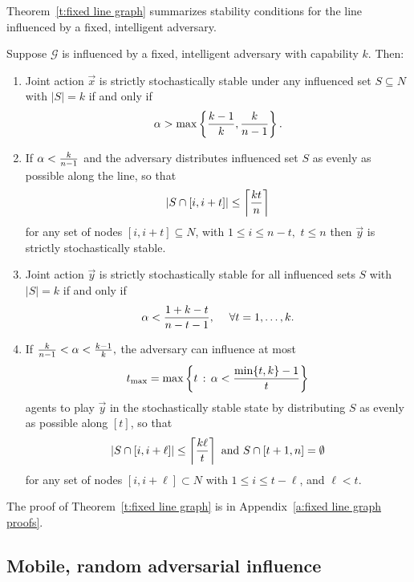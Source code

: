 Theorem~\ref{t:fixed line graph} summarizes stability conditions for the line influenced by a fixed, intelligent adversary.

\begin{Theorem}\label{t:fixed line graph}%
Suppose $\mathcal{G}$ is influenced by a fixed, intelligent adversary with capability $k$. Then:
\begin{enumerate}%

\item Joint action $\vec{x}$ is strictly stochastically stable under any influenced set $S\subseteq N$ with $|S| = k$ if and only if
\begin{equation}
\alpha > \max\left\{{k-1\over k},{k\over n-1}\right\}.
\end{equation}


\item If $\alpha <{k\over n-1}$ and the adversary distributes influenced set $S$ as evenly as possible along the line, so that $$\left|S\cap [i,i+t]\right| \leq \left\lceil {kt\over n}\right\rceil$$ for any set of nodes $[i,i+t]\subseteq N$, with $1\leq i \leq n-t,$ $t\leq n$ 
then $\vec{y}$ is strictly stochastically stable.

\item Joint action $\vec{y}$ is strictly stochastically stable for all influenced sets $S$ with $|S| = k$ if and only if
\begin{equation}
\alpha < {1+k-t\over n-t-1},\;\quad\forall t = 1,\ldots,k.
\end{equation}

\item If ${k\over n-1}< \alpha < {k-1\over k},$ the adversary can influence at most
$$t_{\max} = \max\left\{t\,:\, \alpha < {\min\{t,k\}-1\over t}\right\}$$
agents to play $\vec{y}$ in the stochastically stable state by distributing $S$ as evenly as possible along $[t]$, so that
$$|S\cap [i,i+\ell]|\leq \left\lceil {k\ell\over t}\right\rceil \text{ and } S\cap[t+1,n] = \emptyset$$
for any set of nodes $[i,i+\ell]\subset N$ with $1\leq i\leq t-\ell$, and $\ell < t.$

\end{enumerate}

\end{Theorem}

The proof of Theorem~\ref{t:fixed line graph} is in Appendix~\ref{a:fixed line graph proofs}.


\subsection{Mobile, random adversarial influence}

